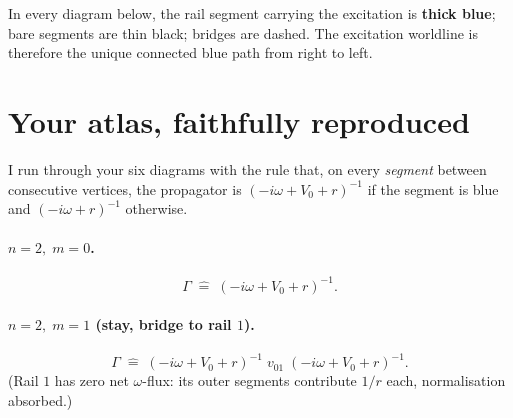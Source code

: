 \documentclass[11pt,a4paper]{article}
\newcommand{\Gex}{(-i\omega+V_{0}+r)^{-1}}
\newcommand{\Gba}{(-i\omega+r)^{-1}}
\begin{document}
In every diagram below, the rail segment carrying the excitation is
\textcolor{blue!70!black}{\textbf{thick blue}}; bare segments are thin
black; bridges are dashed. The excitation worldline is therefore the
unique connected blue path from right to left.

\section{Your atlas, faithfully reproduced}\label{sec:atlas}

I run through your six diagrams with the rule that, on every \emph{segment}
between consecutive vertices, the propagator is $\Gex$ if the segment is
blue and $\Gba$ otherwise.

\paragraph{$n{=}2,\;m{=}0$.}
\begin{center}
\end{center}
\[
\Gamma \;\widehat=\; \Gex.
\]

\paragraph{$n{=}2,\;m{=}1$ (stay, bridge to rail $1$).}
\begin{center}
\end{center}
\[
\Gamma \;\widehat=\; \Gex\; v_{01}\;\Gex.
\]
(Rail $1$ has zero net $\omega$-flux: its outer segments contribute
$1/r$ each, normalisation absorbed.)
\end{document}
